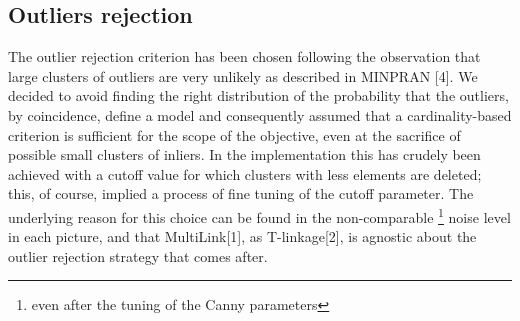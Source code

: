 \documentclass[12pt]{article}
\begin{document}
\subsection{Outliers rejection}
The outlier rejection criterion has been chosen following the observation that large clusters of outliers are very unlikely as described in MINPRAN [4]. We decided to avoid finding the right distribution of the probability that the outliers, by coincidence, define a model and consequently assumed that a cardinality-based criterion is sufficient for the scope of the objective, even at the sacrifice of possible small clusters of inliers. In the implementation this has crudely been achieved with a cutoff value for which clusters with less elements are deleted; this, of course, implied a process of fine tuning of the cutoff parameter. The underlying reason for this choice can be found in the non-comparable \footnote{even after the tuning of the Canny parameters} noise level in each picture, and that MultiLink[1], as T-linkage[2], is agnostic about the outlier rejection strategy that comes after.
\end{document}
